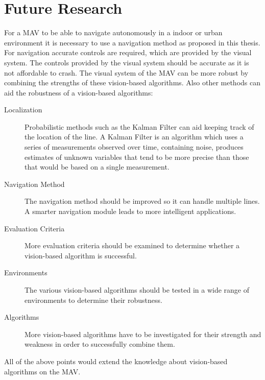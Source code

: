 \documentclass[a4paper]{article}
\begin{document}
\section{Future Research}
For a MAV to be able to navigate autonomously in a indoor or urban environment it is necessary to use a navigation method as proposed in this thesis. For navigation accurate controls are required, which are provided by the visual system. The controls provided by the visual system should be accurate as it is not affordable to crash. The visual system of the MAV can be more robust by combining the strengths of these vision-based algorithms. Also other methods can aid the robustness of a vision-based algorithms:
\begin{description}
\item[Localization] Probabilistic methods such as the Kalman Filter \cite{Welch1995} can aid keeping track of the location of the line. A Kalman Filter is an algorithm which uses a series of measurements observed over time, containing noise, produces estimates of unknown variables that tend to be more precise than those that would be based on a single measurement.
\item[Navigation Method] The navigation method should be improved so it can handle multiple lines. A smarter navigation module leads to more intelligent applications.
\item[Evaluation Criteria] More evaluation criteria should be examined to determine whether a vision-based algorithm is successful.
\item[Environments] The various vision-based algorithms should be tested in a wide range of environments to determine their robustness.
\item[Algorithms] More vision-based algorithms have to be investigated for their strength and weakness in order to successfully combine them.
\end{description}
All of the above points would extend the knowledge about vision-based algorithms on the MAV.
\end{document}
